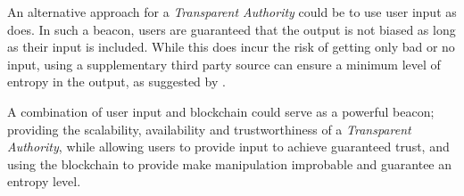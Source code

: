 An alternative approach for a \emph{Transparent Authority} could be to use user input as  does.
In such a beacon, users are guaranteed that the output is not biased as long as their input is included.
While this does incur the risk of getting only bad or no input, using a supplementary third party source can ensure a minimum level of entropy in the output, as suggested by \citep{lenstra2015random}.

A combination of user input and blockchain could serve as a powerful beacon; providing the scalability, availability and trustworthiness of a \emph{Transparent Authority}, while allowing users to provide input to achieve guaranteed trust, and using the blockchain to provide make manipulation improbable and guarantee an entropy level.

